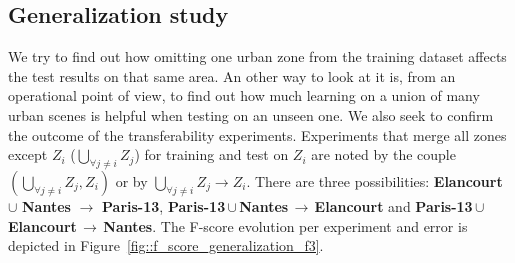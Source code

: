     \subsection{Generalization study}
        \label{subsec::more_experiments::scalability::generalization}
        We try to find out how omitting one urban zone from the training dataset affects the test results on that same area.
        An other way to look at it is, from an operational point of view, to find out how much learning on a union of many urban scenes is helpful when testing on an unseen one.
        We also seek to confirm the outcome of the transferability experiments.
        Experiments that merge all zones except $Z_i$ ($\underset{\forall j \neq i}{\bigcup} Z_j$) for training and test on $Z_i$ are noted by the couple $(\underset{\forall j \neq i}{\bigcup} Z_j, Z_i)$ or by $ \underset{\forall j \neq i}{\bigcup} Z_j \rightarrow Z_i$.
        There are three possibilities: \textbf{Elancourt} $\cup$ \textbf{Nantes} \(\rightarrow\) \textbf{Paris-13}, \mbox{\textbf{Paris-13}}\,$\cup$\,\textbf{Nantes}\,\(\rightarrow\)\,\textbf{Elancourt} and \mbox{\textbf{Paris-13}}\,$\cup$\,\textbf{Elancourt}\,\(\rightarrow\)\,\textbf{Nantes}.
        The F-score evolution per experiment and error is depicted in Figure~\ref{fig::f_score_generalization_f3}.\\
    
        \begin{figure}[htbp]
        \end{figure}

